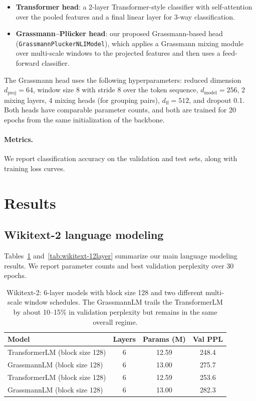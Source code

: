 \documentclass[11pt]{article}
\begin{document}
\begin{itemize}
    \item \textbf{Transformer head}: a 2-layer Transformer-style classifier with self-attention over the pooled features and a final linear layer for 3-way classification.
    \item \textbf{Grassmann--Pl\"ucker head}: our proposed Grassmann-based head (\texttt{GrassmannPluckerNLIModel}), which applies a Grassmann mixing module over multi-scale windows to the projected features and then uses a feed-forward classifier.
\end{itemize}

The Grassmann head uses the following hyperparameters: reduced dimension $d_{\text{proj}} = 64$, window size 8 with stride 8 over the token sequence, $d_{\text{model}} = 256$, 2 mixing layers, 4 mixing heads (for grouping pairs), $d_{\text{ff}} = 512$, and dropout 0.1. Both heads have comparable parameter counts, and both are trained for 20 epochs from the same initialization of the backbone.

\paragraph{Metrics.}
We report classification accuracy on the validation and test sets, along with training loss curves.

\section{Results}

\subsection{Wikitext-2 language modeling}

Tables~\ref{tab:wikitext-6layer} and~\ref{tab:wikitext-12layer} summarize our main language modeling results. We report parameter counts and best validation perplexity over 30 epochs.

\begin{table}[t]
\centering
\begin{tabular}{lccc}
\toprule
Model & Layers & Params (M) & Val PPL \\
\midrule
TransformerLM (block size 128) & 6 & 12.59 & 248.4 \\
GrassmannLM (block size 128) & 6 & 13.00 & 275.7 \\
TransformerLM (block size 128) & 6 & 12.59 & 253.6 \\
GrassmannLM (block size 128) & 6 & 13.00 & 282.3 \\
\bottomrule
\end{tabular}
\caption{Wikitext-2: 6-layer models with block size 128 and two different multi-scale window schedules. The GrassmannLM trails the TransformerLM by about 10--15\% in validation perplexity but remains in the same overall regime.}
\label{tab:wikitext-6layer}
\end{table}
\end{document}
